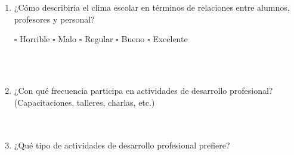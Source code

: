 \documentclass{article}
\begin{document}
\begin{enumerate}[leftmargin=*, label=\arabic*.]
    \newpage
    \item ¿Cómo describiría el clima escolar en términos de relaciones entre alumnos, profesores y personal? %
    \begin{center}
        $\square$ Horrible \hspace{0.7cm} $\square$ Malo \hspace{0.7cm} $\square$ Regular \hspace{0.7cm} $\square$ Bueno \hspace{0.7cm} $\square$ Excelente
    \end{center}
        \underline{\hspace{0.95\linewidth}} \vspace{0.3cm} \\
        \underline{\hspace{0.95\linewidth}} \vspace{0.3cm} \\
        \underline{\hspace{0.95\linewidth}} \vspace{0.3cm}
    
    \item ¿Con qué frecuencia participa en actividades de desarrollo profesional? (Capacitaciones, talleres, charlas, etc.) \\[0.5cm]
        \underline{\hspace{0.95\linewidth}} \vspace{0.3cm} \\
        \underline{\hspace{0.95\linewidth}} \vspace{0.3cm} \\
        \underline{\hspace{0.95\linewidth}} \vspace{0.3cm}

    \item ¿Qué tipo de actividades de desarrollo profesional prefiere? \\[0.5cm]
        \underline{\hspace{0.95\linewidth}} \vspace{0.3cm} \\
        \underline{\hspace{0.95\linewidth}} \vspace{0.3cm} \\
        \underline{\hspace{0.95\linewidth}} \vspace{0.3cm}


\end{enumerate}
\end{document}
